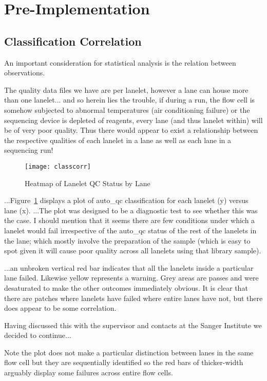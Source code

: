 \section{Pre-Implementation}
\subsection{Classification Correlation}

An important consideration for statistical analysis is the relation between 
observations. 


The quality data files we have are per lanelet, however a lane
can house more than one lanelet...  and so herein lies the trouble, if during a
run, the flow cell is somehow subjected to abnormal temperatures (air
conditioning failure) or the sequencing device is depleted of reagents, every
lane (and thus lanelet within) will be of very poor quality. Thus there would
appear to exist a relationship between the respective qualities of each lanelet
in a lane as well as each lane in a sequencing run!

\begin{figure}[htbp!]
    \centering
    \texttt{[image: classcorr]}
    \caption[ClassCorr]{Heatmap of Lanelet QC Status by Lane}
    \label{fig:classcorr}
\end{figure}

...Figure~\ref{fig:classcorr} displays a plot of auto\_qc classification for
each lanelet (y) versus lane (x). ...The plot was designed to be a diagnostic
test to see whether this was the case. I should mention that it seems there are
few conditions under which a lanelet would fail irrespective of the auto\_qc
status of the rest of the lanelets in the lane; which mostly involve the
preparation of the sample (which is easy to spot given it will cause poor
quality across all lanelets using that library sample).

...an unbroken vertical red bar indicates that all the lanelets inside a
particular lane failed. Likewise yellow represents a warning. Grey areas are
passes and were desaturated to make the other outcomes immediately obvious. It
is clear that there are patches where lanelets have failed where entire lanes
have not, but there does appear to be some correlation.

Having discussed this with the supervisor and contacts at the Sanger Institute
we decided to continue...

Note the plot does not make a particular distinction between lanes in the same
flow cell but they are sequentially identified so the red bars of thicker-width
arguably display some failures across entire flow cells.

